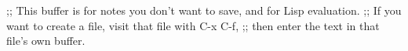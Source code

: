 ;; This buffer is for notes you don't want to save, and for Lisp evaluation.
;; If you want to create a file, visit that file with C-x C-f,
;; then enter the text in that file's own buffer.


\begin{frame}[fragile,t]
\frametitle{}
\end{frame}




\begin{itemize}[<+->]
\end{itemize}

{\scriptsize
\begin{verbatim}
\end{verbatim}
}

\begin{columns}[t]
\end{columns}


